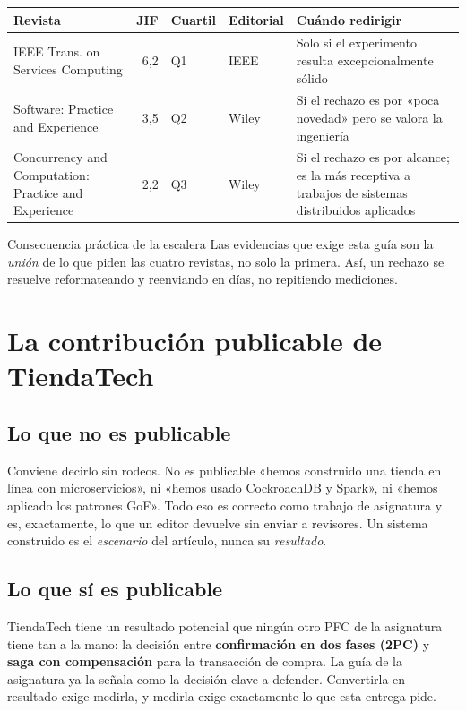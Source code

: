 \documentclass[11pt,a4paper]{article}
\begin{document}
\begin{center}
	\small
	\begin{tabular}{@{}p{5.6cm}rp{1.6cm}p{2.0cm}p{4.0cm}@{}}
		\toprule
		\textbf{Revista} & \textbf{JIF} & \textbf{Cuartil} & \textbf{Editorial} & \textbf{Cuándo redirigir} \\
		\midrule
		IEEE Trans. on Services Computing & 6,2 & Q1 & IEEE & Solo si el experimento resulta excepcionalmente sólido \\
		\addlinespace
		Software: Practice and Experience & 3,5 & Q2 & Wiley & Si el rechazo es por «poca novedad» pero se valora la ingeniería \\
		\addlinespace
		Concurrency and Computation: Practice and Experience & 2,2 & Q3 & Wiley & Si el rechazo es por alcance; es la más receptiva a trabajos de sistemas distribuidos aplicados \\
		\bottomrule
	\end{tabular}
\end{center}

\begin{aviso}{Consecuencia práctica de la escalera}
	Las evidencias que exige esta guía son la \emph{unión} de lo que piden las cuatro revistas, no solo la primera. Así, un rechazo se resuelve reformateando y reenviando en días, no repitiendo mediciones.
\end{aviso}

\section{La contribución publicable de TiendaTech}

\subsection{Lo que no es publicable}

Conviene decirlo sin rodeos. No es publicable «hemos construido una tienda en línea con microservicios», ni «hemos usado CockroachDB y Spark», ni «hemos aplicado los patrones GoF». Todo eso es correcto como trabajo de asignatura y es, exactamente, lo que un editor devuelve sin enviar a revisores. Un sistema construido es el \emph{escenario} del artículo, nunca su \emph{resultado}.

\subsection{Lo que sí es publicable}

TiendaTech tiene un resultado potencial que ningún otro PFC de la asignatura tiene tan a la mano: la decisión entre \textbf{confirmación en dos fases (2PC)} y \textbf{saga con compensación} para la transacción de compra. La guía de la asignatura ya la señala como la decisión clave a defender. Convertirla en resultado exige medirla, y medirla exige exactamente lo que esta entrega pide.
\end{document}
